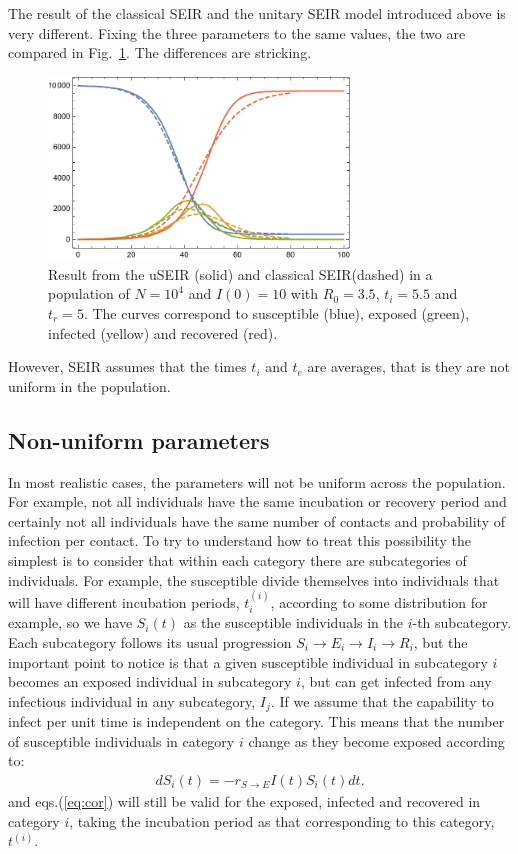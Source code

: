 \documentclass[a4paper,oneside,11pt]{article}
\begin{document}
The result of the classical SEIR and the unitary SEIR model introduced above is very different. Fixing the three parameters to the same values, the two are compared in Fig.~\ref{fig:seirvsuseir}. The differences are stricking. 
\begin{figure}[h!]
  \centering
  \includegraphics[width=8cm]{seirvsuseir.pdf}
  \caption{ Result from the uSEIR (solid) and classical SEIR(dashed) in a  population of $N=10^4$ and $I(0)=10$ with $R_0=3.5$, $t_i=5.5$ and $t_r=5$. The curves correspond to 
  susceptible (blue), exposed (green), infected (yellow) and recovered (red).  }
  \label{fig:seirvsuseir}
   \end{figure}  
   However, SEIR assumes that the times $t_i$ and $t_e$ are averages, that is they are not uniform in the population. 
          
\subsection{Non-uniform parameters }

In most realistic cases, the parameters will not be uniform across the population. For example, not all individuals have the same incubation or recovery period and certainly not all individuals have the same number of contacts and probability of infection per contact. To try to understand how to treat this possibility the simplest is to consider that within each category there are subcategories of individuals. For example, the susceptible divide themselves into individuals that will have different incubation periods, $t_i^{(i)}$,  according to some distribution for example, so we have $S_i(t)$ as the susceptible individuals in the $i$-th subcategory. Each subcategory follows its usual progression $S_i\rightarrow E_i \rightarrow I_i \rightarrow R_i$, but the important point to notice is that a given susceptible individual in subcategory $i$ becomes an exposed individual in subcategory $i$, but can get infected from any infectious individual in any subcategory, $I_j$. If we assume that the capability to infect per unit time is independent on the category. This means that the number of susceptible individuals in category $i$ change as they become exposed according to:
\begin{eqnarray}
d S_i(t) = - r_{S\rightarrow E} I(t) S_i(t) dt.
\end{eqnarray}
and eqs.(\ref{eq:cor}) will still be valid for the exposed, infected and recovered in category $i$, taking the incubation period as that corresponding to this category, $t^{(i)}$. 
\end{document}
